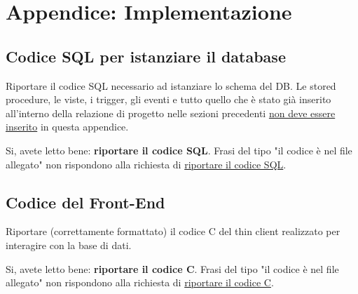 \section{Appendice: Implementazione}

\subsection*{Codice SQL per istanziare il database}

\begin{templateblock}
    Riportare il codice SQL necessario ad istanziare lo schema del DB.
    Le stored procedure, le viste, i trigger, gli eventi e tutto quello che
    è stato già inserito all’interno della relazione di progetto nelle sezioni
    precedenti \underline{non deve essere inserito} in questa appendice.

    Si, avete letto bene: \textbf{riportare il codice SQL}. Frasi del tipo
    "il codice è nel file allegato" non rispondono alla richiesta di
    \underline{riportare il codice SQL}.
\end{templateblock}

\subsection*{Codice del Front-End}

\begin{templateblock}
    Riportare (correttamente formattato) il codice C del thin client realizzato
    per interagire con la base di dati.

    Si, avete letto bene: \textbf{riportare il codice C}. Frasi del tipo
    "il codice è nel file allegato" non rispondono alla richiesta di
    \underline{riportare il codice C}.
\end{templateblock}
